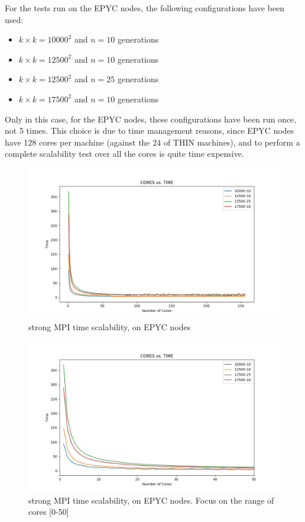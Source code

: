 \documentclass[12pt, titlepage]{report}
\begin{document}
For the tests run on the EPYC nodes, the following configurations have been used:
\begin{itemize}
	\item $k\times k = 10000^2$ and $n=10$ generations
	\item $k\times k = 12500^2$ and $n=10$ generations
	\item $k\times k = 12500^2$ and $n=25$ generations
	\item $k\times k = 17500^2$ and $n=10$ generations
\end{itemize}
Only in this case, for the EPYC nodes, these configurations have been run once, not 5 times. This choice is due to time management reasons, 
since EPYC nodes have 128 cores per machine (against the 24 of THIN machines), and to perform a complete scalability test over all the cores is quite time expensive.
\begin{figure}[H]
	\centering
	\includegraphics[width=\textwidth]{Assignment-1/cores_vs_time.png}
	\caption{strong MPI time scalability, on EPYC nodes}
\end{figure}
\begin{figure}[H]
	\centering
	\includegraphics[width=\textwidth]{Assignment-1/cores_vs_time_focus.png}
	\caption{strong MPI time scalability, on EPYC nodes. Focus on the range of cores [0-50]}
\end{figure}
\end{document}

